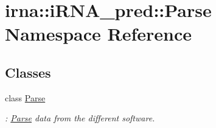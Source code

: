 \hypertarget{namespaceirna_1_1iRNA__pred_1_1Parse}{
\section{irna\-:\-:i\-R\-N\-A\-\_\-pred\-:\-:\-Parse \-Namespace \-Reference}
\label{namespaceirna_1_1iRNA__pred_1_1Parse}
}
\subsection*{\-Classes}
\begin{DoxyCompactItemize}
\item 
class \hyperlink{classirna_1_1iRNA__pred_1_1Parse_1_1Parse}{\-Parse}
\begin{DoxyCompactList}\small\item\em \-: \hyperlink{classirna_1_1iRNA__pred_1_1Parse_1_1Parse}{\-Parse} data from the different software. \end{DoxyCompactList}\end{DoxyCompactItemize}

